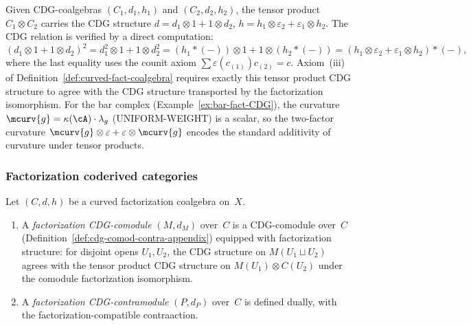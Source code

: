 \begin{remark}
\label{rem:curvature-factorization}
Given CDG-coalgebras $(C_1, d_1, h_1)$ and $(C_2, d_2, h_2)$,
the tensor product $C_1 \otimes C_2$ carries the CDG structure
$d = d_1 \otimes 1 + 1 \otimes d_2$,
$h = h_1 \otimes \varepsilon_2 + \varepsilon_1 \otimes h_2$.
The CDG relation is verified by a direct computation:
\[
(d_1 \otimes 1 + 1 \otimes d_2)^2
= d_1^2 \otimes 1 + 1 \otimes d_2^2
= (h_1 \ast ({-})) \otimes 1 + 1 \otimes (h_2 \ast ({-}))
= (h_1 \otimes \varepsilon_2 + \varepsilon_1 \otimes h_2)
\ast ({-}),
\]
where the last equality uses the counit axiom
$\sum \varepsilon(c_{(1)}) c_{(2)} = c$.
Axiom~(iii) of Definition~\ref{def:curved-fact-coalgebra}
requires exactly this tensor product CDG structure to agree with
the CDG structure transported by the factorization isomorphism.
For the bar complex (Example~\ref{ex:bar-fact-CDG}), the curvature
$\mcurv{g} = \kappa(\cA) \cdot \lambda_g$ \textup{(UNIFORM-WEIGHT)} is a scalar, so the
two-factor curvature
$\mcurv{g} \otimes \varepsilon + \varepsilon \otimes \mcurv{g}$
encodes the standard additivity of curvature under tensor products.
\end{remark}

\subsubsection*{Factorization coderived categories}

\begin{definition}
\label{def:fact-cdg-comod-contra}
Let $(C, d, h)$ be a curved factorization coalgebra on~$X$.
\begin{enumerate}[label=\textup{(\roman*)}]
\item A \emph{factorization CDG-comodule} $(M, d_M)$ over~$C$
 is a CDG-comodule over~$C$
 (Definition~\ref{def:cdg-comod-contra-appendix}) equipped with
 factorization structure: for disjoint opens $U_1, U_2$, the
 CDG structure on $M(U_1 \sqcup U_2)$ agrees with the tensor
 product CDG structure on
 $M(U_1) \otimes C(U_2)$
 under the comodule factorization isomorphism.
\item A \emph{factorization CDG-contramodule} $(P, d_P)$
 over~$C$ is defined dually, with the factorization-compatible
 contraaction.
\end{enumerate}
\end{definition}


